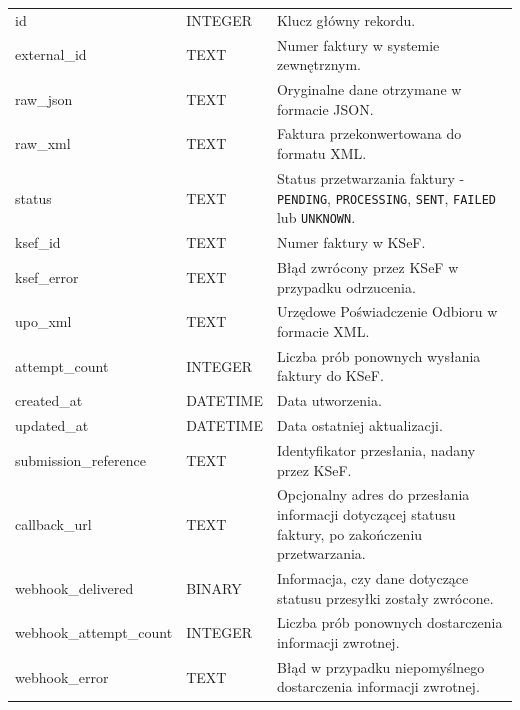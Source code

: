 \begin{small}
\begin{longtable}{>{\raggedright\arraybackslash}p{4cm} >{\raggedright\arraybackslash}p{2cm} >{\raggedright\arraybackslash}p{7cm}}
id & INTEGER & Klucz główny rekordu. \\
external\_id & TEXT & Numer faktury w systemie zewnętrznym. \\
raw\_json & TEXT & Oryginalne dane otrzymane w formacie JSON. \\
raw\_xml & TEXT & Faktura przekonwertowana do formatu XML. \\
status & TEXT & Status przetwarzania faktury - \texttt{PENDING}, \texttt{PROCESSING}, \texttt{SENT}, \texttt{FAILED} lub \texttt{UNKNOWN}. \\
ksef\_id & TEXT & Numer faktury w KSeF. \\
ksef\_error & TEXT & Błąd zwrócony przez KSeF w przypadku odrzucenia. \\
upo\_xml & TEXT & Urzędowe Poświadczenie Odbioru w formacie XML. \\
attempt\_count & INTEGER & Liczba prób ponownych wysłania faktury do KSeF. \\
created\_at & DATETIME & Data utworzenia. \\
updated\_at & DATETIME & Data ostatniej aktualizacji. \\
submission\_reference & TEXT & Identyfikator przesłania, nadany przez KSeF. \\
callback\_url & TEXT & Opcjonalny adres do przesłania informacji dotyczącej statusu faktury, po zakończeniu przetwarzania. \\
webhook\_delivered & BINARY & Informacja, czy dane dotyczące statusu przesyłki zostały zwrócone. \\
webhook\_attempt\_count & INTEGER & Liczba prób ponownych dostarczenia informacji zwrotnej. \\
webhook\_error & TEXT & Błąd w przypadku niepomyślnego dostarczenia informacji zwrotnej. \\
\end{longtable}
\end{small}

